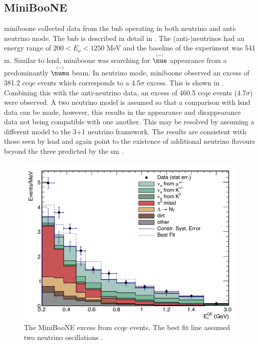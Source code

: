 \subsection{MiniBooNE}
\gls{miniboone} collected data from the \gls{bnb} operating in both neutrino and anti-neutrino mode. The \gls{bnb} is described in detail in . The (anti-)neutrinos had an energy range of $200 < E_\nu < 1250$ MeV and the baseline of the experiment was 541 m. Similar to \gls{lsnd}, \gls{miniboone} was searching for  $\overset{\scriptscriptstyle(-)}{\nue}$ appearance from a predominantly $\overset{\scriptscriptstyle(-)}{\numu}$ beam. In neutrino mode, \gls{miniboone} observed an excess of 381.2 \gls{ccqe} events which corresponds to a 4.5$\sigma$ excess. This is shown in . Combining this with the anti-neutrino data, an excess of 460.5 \gls{ccqe} events (4.7$\sigma$) were observed. A two neutrino model is assumed so that a comparison with \gls{lsnd} data can be made, however, this results in the appearance and disappearance data not being compatible with one another. This may be resolved by assuming a different model to the 3+1 neutrino framework. The results are consistent with those seen by \gls{lsnd} and again point to the existence of additional neutrino flavours beyond the three predicted by the \gls{sm} \cite{MiniBooNE_excess}. 
\begin{figure}[h!]
    \centering
    \includegraphics[width = \largefigwidth]{figures-chap2/MiniBooNE_excess.png}
    \caption[MiniBooNE excess.]{The MiniBooNE excess from \nue \gls{ccqe} events. The best fit line assumed two neutrino oscillations \cite{MiniBooNE_excess}.}
    \label{fig:MiniBooNE excess}
\end{figure}
\newpage

